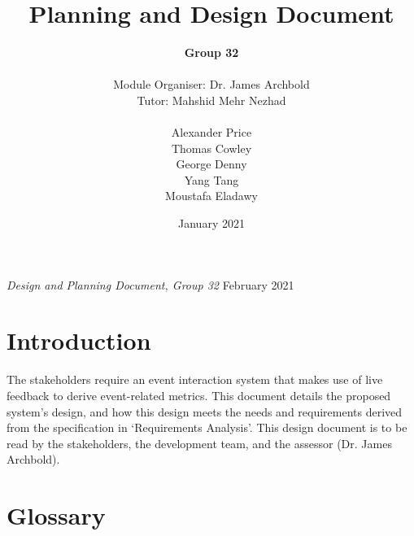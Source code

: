 \documentclass[9pt, titlepage]{extarticle}
\title{Planning and Design Document}
\author{
\LARGE{
\textbf{Group 32} \\\\
Module Organiser: Dr. James Archbold \\
Tutor: Mahshid Mehr Nezhad \\\\
Alexander Price \\
Thomas Cowley \\
George Denny \\
Yang Tang \\
Moustafa Eladawy
}}
\date{January 2021}
\begin{document}

\Large{
\emph{Design and Planning Document, Group 32}
\hfill
February 2021}
\normalsize{}

\section{Introduction}

The stakeholders require an event interaction system that makes use of live feedback to derive event-related metrics.
This document details the proposed system's design, and how this design meets the needs and requirements derived from the specification in `Requirements Analysis'. 
This design document is to be read by the stakeholders, the development team, and the assessor (Dr. James Archbold).
\section{Glossary}
\end{document}
